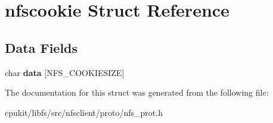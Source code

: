 \hypertarget{structnfscookie}{}\section{nfscookie Struct Reference}
\label{structnfscookie}
\subsection*{Data Fields}
\begin{DoxyCompactItemize}
\item 
\mbox{\label{structnfscookie_a95fb438eacd83380934bec9873a1b263}} 
char {\bfseries data} \mbox{[}N\+F\+S\+\_\+\+C\+O\+O\+K\+I\+E\+S\+I\+ZE\mbox{]}
\end{DoxyCompactItemize}


The documentation for this struct was generated from the following file\+:\begin{DoxyCompactItemize}
\item 
cpukit/libfs/src/nfsclient/proto/nfs\+\_\+prot.\+h\end{DoxyCompactItemize}
